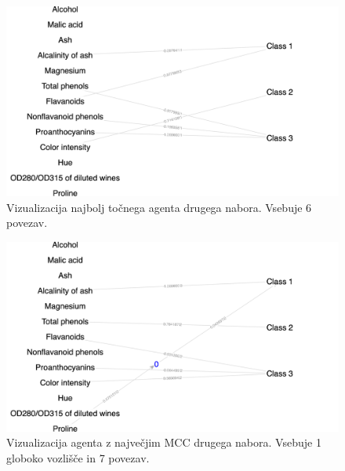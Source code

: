 \begin{figure}[H]
    \begin{center}
        \includegraphics[width=13cm]{wine/2/acc_g}
    \end{center}
    \caption{Vizualizacija najbolj točnega agenta drugega nabora. Vsebuje 6 povezav.}
    \label{fig:wine_acc_2_g}
\end{figure}

\begin{figure}[H]
    \begin{center}
        \includegraphics[width=13cm]{wine/2/mcc_g}
    \end{center}
    \caption{Vizualizacija agenta z največjim MCC drugega nabora. Vsebuje 1 globoko vozlišče in 7 povezav.}
    \label{fig:wine_mcc_2_g}
\end{figure}

